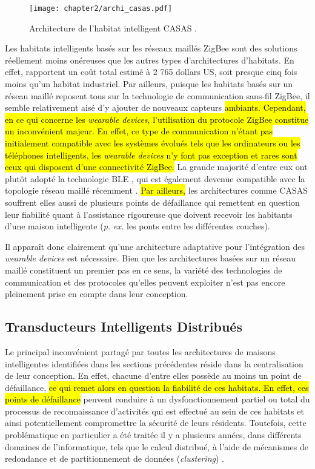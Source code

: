 \begin{figure}[H]
	\centering
	\texttt{[image: chapter2/archi\_casas.pdf]}
	\caption[Architecture de l'habitat intelligent CASAS.]{Architecture de l'habitat intelligent CASAS \citep{Cook2013}.}
	\label{fig:archi_casas}
\end{figure}

Les habitats intelligents basés sur les réseaux maillés ZigBee sont des solutions réellement moins onéreuses que les autres types d'architectures d'habitats. En effet, \cite{Cook2013} rapportent un coût total estimé à 2 765 dollars US, soit presque cinq fois moins qu'un habitat industriel. Par ailleurs, puisque les habitats basés sur un réseau maillé reposent tous sur la technologie de communication sans-fil ZigBee, il semble relativement aisé d'y ajouter de nouveaux capteurs \hl{ambiants. Cependant, en ce qui concerne les \textit{wearable devices}, l'utilisation du protocole ZigBee constitue un inconvénient majeur. En effet, ce type de communication n'étant pas initialement compatible avec les systèmes évolués tels que les ordinateurs ou les téléphones intelligents, les \textit{wearable devices} n'y font pas exception et rares sont ceux qui disposent d'une connectivité ZigBee.} La grande majorité d'entre eux ont plutôt adopté la technologie \ac{BLE} \citep{Martin2014}, qui est également devenue compatible avec la topologie réseau maillé récemment \citep{Bluetooth2017}. \hl{Par ailleurs,} les architectures comme CASAS souffrent elles aussi de plusieurs points de défaillance qui remettent en question leur fiabilité quant à l'assistance rigoureuse que doivent recevoir les habitants d'une maison intelligente (\textit{p. ex.} les ponts entre les différentes couches).

Il apparaît donc clairement qu'une architecture adaptative pour l'intégration des \textit{wearable devices} est nécessaire. Bien que les architectures basées sur un réseau maillé constituent un premier pas en ce sens, la variété des technologies de communication et des protocoles qu'elles peuvent exploiter n'est pas encore pleinement prise en compte dans leur conception.

\subsection{Transducteurs Intelligents Distribués}

Le principal inconvénient partagé par toutes les architectures de maisons intelligentes identifiées dans les sections précédentes réside dans la centralisation de leur conception. En effet, chacune d'entre elles possède au moins un point de défaillance, \hl{ce qui remet alors en question la fiabilité de ces habitats. En effet, ces points de défaillance} peuvent conduire à un dysfonctionnement partiel ou total du processus de reconnaissance d'activités qui est effectué au sein de ces habitats et ainsi potentiellement compromettre la sécurité de leurs résidents. Toutefois, cette problématique en particulier a été traitée il y a plusieurs années, dans différents domaines de l'informatique, tels que le calcul distribué, à l'aide de mécanismes de redondance et de partitionnement de données (\textit{clustering}) \citep{Dikaiakos2009,Zaharia2010,JafarnejadGhomi2017}.

